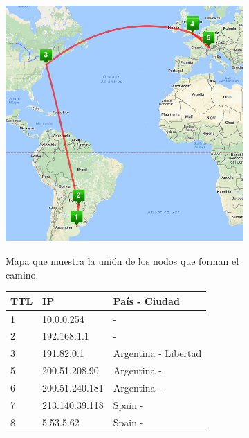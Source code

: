 \begin{figure}[ht]
  \hspace*{-0.4cm}
  \begin{subfigure}[b]{.60\textwidth}
    \includegraphics[width=\textwidth]{Imagenes/capetown_map.png}
    \label{fig:capetown_map}
    \caption{Mapa que muestra la unión de los nodos que forman el camino.}
  \end{subfigure}
  \begin{subfigure}[b]{.39\textwidth}
    \footnotesize
    \begin{tabular}{ l l l }
      \hline
      \textbf{TTL} & \textbf{IP} &  \textbf{País - Ciudad} \\ \hline
      \rowcolor[RGB]{196,214,255}
      1 & 10.0.0.254 &  - \\ \hline
      2 & 192.168.1.1 &  - \\ \hline
      \rowcolor[RGB]{196,214,255}
      3 & 191.82.0.1 & Argentina - Libertad\\ \hline
      5 & 200.51.208.90 & Argentina - \\ \hline
      6 & 200.51.240.181 & Argentina - \\ \hline
      7 & 213.140.39.118 & Spain - \\ \hline
      \rowcolor[RGB]{196,214,255}
      8 & 5.53.5.62 & Spain - \\ \hline

\end{tabular}
\end{subfigure}
\end{figure}
